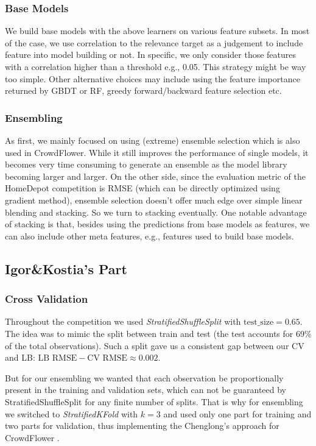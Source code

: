 \documentclass[12pt]{article}
\begin{document}
{{\subsubsection{Base Models}
We build base models with the above learners on various feature subsets. In most of the case, we use correlation to the relevance target as a judgement to include feature into model building or not. In specific, we only consider those features with a correlation higher than a threshold e.g., 0.05. This strategy might be way too simple. Other alternative choices may include using the feature importance returned by GBDT or RF, greedy forward/backward feature selection etc.

\subsubsection{Ensembling}
As first, we mainly focused on using (extreme) ensemble selection which is also used in CrowdFlower. While it still improves the performance of single models, it becomes very time consuming to generate an ensemble as the model library becoming larger and larger. On the other side, since the evaluation metric of the HomeDepot competition is RMSE (which can be directly optimized using gradient method), ensemble selection doesn't offer much edge over simple linear blending and stacking. So we turn to stacking eventually. One notable advantage of stacking is that, besides using the predictions from base models as features, we can also include other meta features, e.g., features used to build base models.



\subsection{Igor\&Kostia's Part}
\subsubsection{Cross Validation}

Throughout the competition we used \emph{StratifiedShuffleSplit} with $\text{test\_size}=0.65$. The idea was to mimic the split between train and test (the test accounts for $69\%$ of the total observations). Such a split gave us a consistent gap between our CV and LB: $\text{LB RMSE} - \text{CV RMSE} \approx 0.002$.

But for our ensembling we wanted that each observation be proportionally present in the training and validation sets, which can not be guaranteed by StratifiedShuffleSplit for any finite number of splits. That is why for ensembling we switched to \emph{StratifiedKFold} with $k=3$ and used only one part for training and two parts for validation, thus implementing the Chenglong's approach for CrowdFlower \cite{CrowdFlower_1st}.


}}
\end{document}
